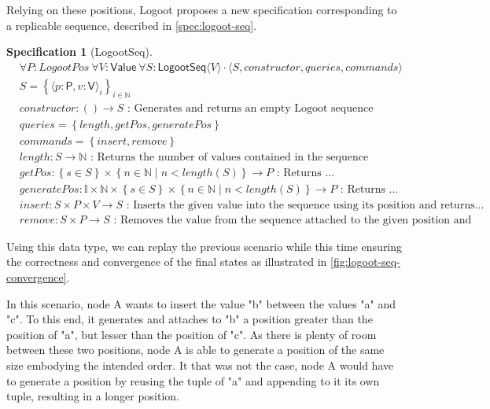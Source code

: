 \documentclass{article}
\newcommand{\commands}[1]{commands = \set{#1}}
\newcommand{\fnspec}[3]{#1: #2 \text{ : #3}}
\newcommand{\inbb}[1]{\in \mathbb{#1}}
\newcommand{\queries}[1]{queries = \set{#1}}
\newcommand{\set}[1]{\left\{#1\right\}} %
\newcommand{\spectuple}[1]{\tuple{#1, constructor, queries, commands}}
\newcommand{\ssep}{\mid} %
\newcommand{\tuple}[1]{\langle #1 \rangle}
\theoremstyle{definition}
\theoremstyle{definition}
\theoremstyle{definition}
\newcounter{specificationcounter}
\theoremstyle{definition}
\newtheorem{specification}[specificationcounter]{Specification}
\begin{document}
Relying on these positions, Logoot proposes a new specification corresponding to a replicable sequence, described in \autoref{spec:logoot-seq}.

\begin{specification}[LogootSeq]
    \begin{align*}
    &\forall P: LogootPos \ \forall V: \mathsf{Value} \ \forall S: \mathsf{LogootSeq} \tuple{V} \cdot \spectuple{S}\\
    &S = \set{\tuple{p: \mathsf{P}, v: \mathsf{V}}_i}_{i \inbb{N}}\\
    &\fnspec{constructor}{\left( \right) \to S}{Generates and returns an empty Logoot sequence}\\
    &\queries{length, getPos, generatePos}\\
    &\commands{insert, remove}\\
    &\fnspec{length}{S \to \mathbb{N}}{Returns the number of values contained in the sequence}\\
    &\fnspec{getPos}{\set{s \in S} \times \set{n \inbb{N} \ssep n < length(S)} \to P}{Returns ...}\\
    &\fnspec{generatePos}{\mathbb{I} \times \mathbb{N} \times \set{s \in S} \times \set{n \inbb{N} \ssep n < length(S)} \to P}{Returns ...}\\
    &\fnspec{insert}{S \times P \times V \to S}{Inserts the given value into the sequence using its position and returns...}\\
    &\fnspec{remove}{S \times P \to S}{Removes the value from the sequence attached to the given position and returns...}
    \end{align*}
    \label{spec:logoot-seq}
\end{specification}

Using this data type, we can replay the previous scenario while this time ensuring the correctness and convergence of the final states as illustrated in \autoref{fig:logoot-seq-convergence}.

In this scenario, node A wants to insert the value "b" between the values "a" and "c".
To this end, it generates and attaches to "b" a position greater than the position of "a", but lesser than the position of "c".
As there is plenty of room between these two positions, node A is able to generate a position of the same size embodying the intended order.
It that was not the case, node A would have to generate a position by reusing the tuple of "a" and appending to it its own tuple, resulting in a longer position.
\end{document}
